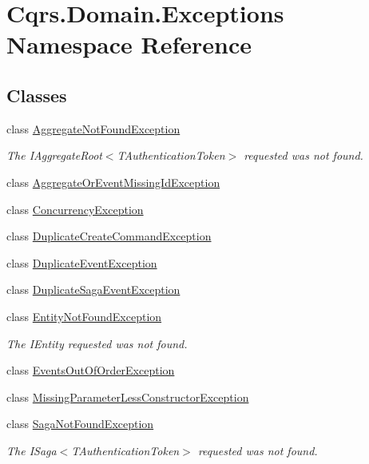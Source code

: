 \hypertarget{namespaceCqrs_1_1Domain_1_1Exceptions}{}\section{Cqrs.\+Domain.\+Exceptions Namespace Reference}
\label{namespaceCqrs_1_1Domain_1_1Exceptions}
\subsection*{Classes}
\begin{DoxyCompactItemize}
\item 
class \hyperlink{classCqrs_1_1Domain_1_1Exceptions_1_1AggregateNotFoundException}{Aggregate\+Not\+Found\+Exception}
\begin{DoxyCompactList}\small\item\em The I\+Aggregate\+Root$<$\+T\+Authentication\+Token$>$ requested was not found. \end{DoxyCompactList}\item 
class \hyperlink{classCqrs_1_1Domain_1_1Exceptions_1_1AggregateOrEventMissingIdException}{Aggregate\+Or\+Event\+Missing\+Id\+Exception}
\item 
class \hyperlink{classCqrs_1_1Domain_1_1Exceptions_1_1ConcurrencyException}{Concurrency\+Exception}
\item 
class \hyperlink{classCqrs_1_1Domain_1_1Exceptions_1_1DuplicateCreateCommandException}{Duplicate\+Create\+Command\+Exception}
\item 
class \hyperlink{classCqrs_1_1Domain_1_1Exceptions_1_1DuplicateEventException}{Duplicate\+Event\+Exception}
\item 
class \hyperlink{classCqrs_1_1Domain_1_1Exceptions_1_1DuplicateSagaEventException}{Duplicate\+Saga\+Event\+Exception}
\item 
class \hyperlink{classCqrs_1_1Domain_1_1Exceptions_1_1EntityNotFoundException}{Entity\+Not\+Found\+Exception}
\begin{DoxyCompactList}\small\item\em The I\+Entity requested was not found. \end{DoxyCompactList}\item 
class \hyperlink{classCqrs_1_1Domain_1_1Exceptions_1_1EventsOutOfOrderException}{Events\+Out\+Of\+Order\+Exception}
\item 
class \hyperlink{classCqrs_1_1Domain_1_1Exceptions_1_1MissingParameterLessConstructorException}{Missing\+Parameter\+Less\+Constructor\+Exception}
\item 
class \hyperlink{classCqrs_1_1Domain_1_1Exceptions_1_1SagaNotFoundException}{Saga\+Not\+Found\+Exception}
\begin{DoxyCompactList}\small\item\em The I\+Saga$<$\+T\+Authentication\+Token$>$ requested was not found. \end{DoxyCompactList}\end{DoxyCompactItemize}
